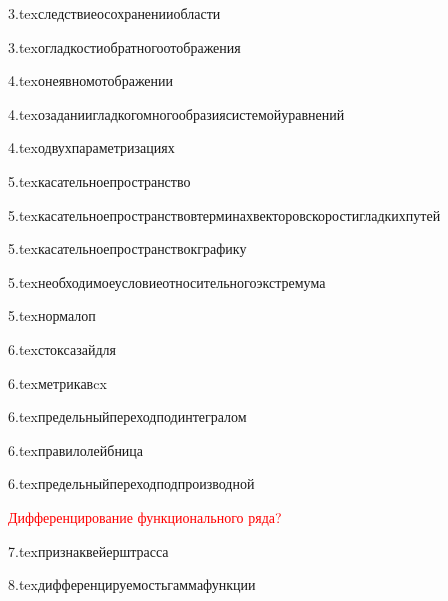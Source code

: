 {3.tex}{следствиеосохраненииобласти}

{3.tex}{огладкостиобратногоотображения}

{4.tex}{онеявномотображении}

{4.tex}{озаданиигладкогомногообразиясистемойуравнений}

{4.tex}{одвухпараметризациях}

{5.tex}{касательноепространство}

{5.tex}{касательноепространствовтерминахвекторовскоростигладкихпутей}

{5.tex}{касательноепространствокграфику}

{5.tex}{необходимоеусловиеотносительногоэкстремума}

{5.tex}{нормалоп}

{6.tex}{стоксазайдля}

{6.tex}{метрикавcx}

{6.tex}{предельныйпереходподинтегралом}

{6.tex}{правилолейбница}

{6.tex}{предельныйпереходподпроизводной}

\textcolor{red}{Дифференцирование функционального ряда?}

{7.tex}{признаквейерштрасса}

{8.tex}{дифференцируемостьгаммафункции}

